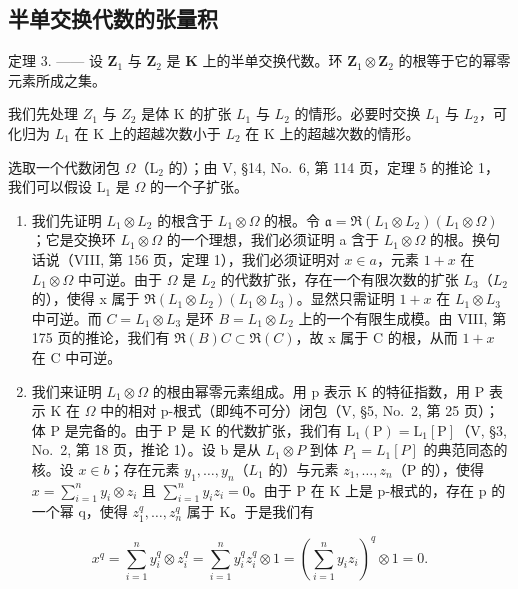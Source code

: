 \subsection{半单交换代数的张量积}

定理 3. —— 设 \(\mathbf{Z}_1\) 与 \(\mathbf{Z}_2\) 是 \(\mathbf{K}\) 上的半单交换代数。环 \(\mathbf{Z}_1 \otimes \mathbf{Z}_2\) 的根等于它的幂零元素所成之集。

我们先处理 \(Z_{1}\) 与 \(Z_{2}\) 是体 K 的扩张 \(L_{1}\) 与 \(L_{2}\) 的情形。必要时交换 \(L_{1}\) 与 \(L_{2}\)，可化归为 \(L_{1}\) 在 K 上的超越次数小于 \(L_{2}\) 在 K 上的超越次数的情形。

选取一个代数闭包 \(\Omega\)（\(\mathrm{L}_2\) 的）；由 V, §14, No.~6, 第 114 页，定理 5 的推论 1，我们可以假设 \(\mathrm{L}_1\) 是 \(\Omega\) 的一个子扩张。

\begin{enumerate}
\def\labelenumi{\Alph{enumi})}
\item
  我们先证明 \(L_{1} \otimes L_{2}\) 的根含于 \(L_{1} \otimes \Omega\) 的根。令 \(\mathfrak{a} = \Re(L_{1} \otimes L_{2})(L_{1} \otimes \Omega)\)；它是交换环 \(L_{1} \otimes \Omega\) 的一个理想，我们必须证明 a 含于 \(L_{1} \otimes \Omega\) 的根。换句话说（VIII, 第 156 页，定理 1），我们必须证明对 \(x \in a\)，元素 \(1 + x\) 在 \(L_{1} \otimes \Omega\) 中可逆。由于 \(\Omega\) 是 \(L_{2}\) 的代数扩张，存在一个有限次数的扩张 \(L_{3}\)（\(L_{2}\) 的），使得 x 属于 \(\Re(L_{1} \otimes L_{2})(L_{1} \otimes L_{3})\)。显然只需证明 \(1 + x\) 在 \(L_{1} \otimes L_{3}\) 中可逆。而 \(C = L_{1} \otimes L_{3}\) 是环 \(B = L_{1} \otimes L_{2}\) 上的一个有限生成模。由 VIII, 第 175 页的推论，我们有 \(\Re(B)C \subset \Re(C)\)，故 x 属于 C 的根，从而 \(1 + x\) 在 C 中可逆。
\item
  我们来证明 \(L_{1} \otimes \Omega\) 的根由幂零元素组成。用 p 表示 K 的特征指数，用 P 表示 K 在 \(\Omega\) 中的相对 p-根式（即纯不可分）闭包（V, §5, No.~2, 第 25 页）；体 P 是完备的。由于 P 是 K 的代数扩张，我们有 \(\mathrm{L}_{1}(\mathrm{P}) = \mathrm{L}_{1}[\mathrm{P}]\)（V, §3, No.~2, 第 18 页，推论 1）。设 b 是从 \(L_{1} \otimes P\) 到体 \(P_{1} = L_{1}[P]\) 的典范同态的核。设 \(x \in b\)；存在元素 \(y_{1}, \ldots, y_{n}\)（\(L_{1}\) 的）与元素 \(z_{1}, \ldots, z_{n}\)（P 的），使得 \(x = \sum_{i=1}^{n} y_{i} \otimes z_{i}\) 且 \(\sum_{i=1}^{n} y_{i} z_{i} = 0\)。由于 P 在 K 上是 p-根式的，存在 p 的一个幂 q，使得 \(z_{1}^{q}, \ldots, z_{n}^{q}\) 属于 K。于是我们有
\end{enumerate}

\[
x ^ {q} = \sum_ {i = 1} ^ {n} y _ {i} ^ {q} \otimes z _ {i} ^ {q} = \sum_ {i = 1} ^ {n} y _ {i} ^ {q} z _ {i} ^ {q} \otimes 1 = \left(\sum_ {i = 1} ^ {n} y _ {i} z _ {i}\right) ^ {q} \otimes 1 = 0.
\]

